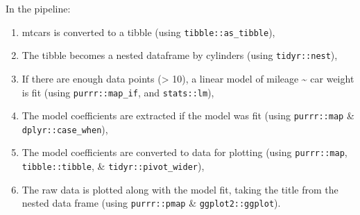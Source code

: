 \documentclass[]{book}
\providecommand{\tightlist}{%
  \setlength{\itemsep}{0pt}\setlength{\parskip}{0pt}}
\begin{document}
In the pipeline:

\begin{enumerate}
\def\labelenumi{\arabic{enumi}.}
\tightlist
\item
  mtcars is converted to a tibble (using \texttt{tibble::as\_tibble}),
\item
  The tibble becomes a nested dataframe by cylinders (using \texttt{tidyr::nest}),
\item
  If there are enough data points (\textgreater{} 10), a linear model of mileage \textasciitilde{} car weight is fit (using \texttt{purrr::map\_if}, and \texttt{stats::lm}),
\item
  The model coefficients are extracted if the model was fit (using \texttt{purrr::map} \& \texttt{dplyr::case\_when}),
\item
  The model coefficients are converted to data for plotting (using \texttt{purrr::map}, \texttt{tibble::tibble}, \& \texttt{tidyr::pivot\_wider}),
\item
  The raw data is plotted along with the model fit, taking the title from the nested data frame (using \texttt{purrr::pmap} \& \texttt{ggplot2::ggplot}).
\end{enumerate}
\end{document}
